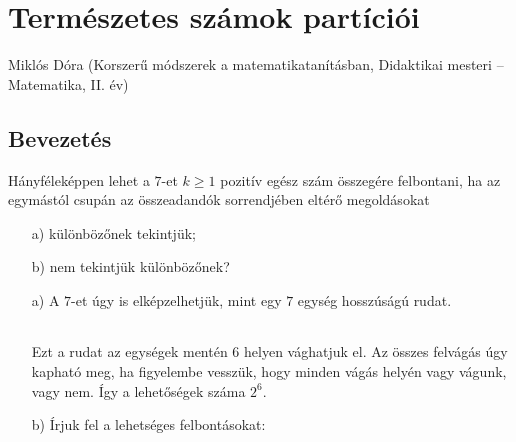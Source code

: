 
\chapter{Természetes számok partíciói}\label{chap:particiok}
\begin{description}
	{\large \item [{Szerző:}] Miklós Dóra (Korszerű módszerek a matematikatanításban, Didaktikai mesteri -- Matematika, 
	II. év)}
\end{description}

\section*{Bevezetés}
\begin{problem}
Hányféleképpen lehet a $7$-et $k\geq1$ pozitív egész szám összegére
felbontani, ha az egymástól csupán az összeadandók sorrendjében eltérő
megoldásokat 
\begin{enumerate}
\item[a)] különbözőnek tekintjük; 
\item[b)] nem tekintjük különbözőnek? 
\item[a)] A $7$-et úgy is elképzelhetjük, mint egy $7$ egység hosszúságú
rudat. 
\begin{center}
\begin{tabular}{|c|c|c|c|c|c|c|}
	\hline 
	&  &  &  &  &  & \tabularnewline
	\hline 
\end{tabular}
\end{center}
Ezt a rudat az egységek mentén $6$ helyen vághatjuk el. Az összes
felvágás úgy kapható meg, ha figyelembe vesszük, hogy minden vágás
helyén vagy vágunk, vagy nem. Így a lehetőségek száma $2^{6}$. 
\item[b)] Írjuk fel a lehetséges felbontásokat:


\end{enumerate}
\end{problem}

